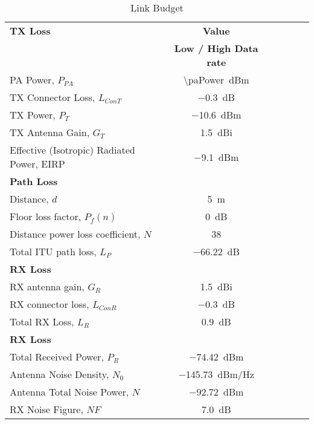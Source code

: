\begin{table}[htbp]
  \centering
  \caption{Link Budget}
    \begin{tabular}{lccccr}
    \rowcolor[rgb]{ 0,  0,  0} \textcolor[rgb]{ 1,  1,  1}{\textbf{TX Loss}}	& \textcolor[rgb]{ 1,  1,  1}{\textbf{Value}} 		\\
    \rowcolor[rgb]{ 0,  0,  0} \textcolor[rgb]{ 1,  1,  1}{} & \textcolor[rgb]{ 1,  1,  1}{\textbf{Low / High Data rate}} 		\\
    PA Power, $P_{PA}$ 						& \SI{\paPower}{dBm}										\\
    TX Connector Loss, $L_{ConT}$  				& \SI{-0.3}{dB} 											\\
    TX Power, $P_T$ 							& \SI{-10.6}{dBm}											\\
    TX Antenna Gain, $G_T$ 					& \SI{1.5}{dBi} 											\\
    Effective (Isotropic) Radiated Power, EIRP  		& \SI{-9.1}{dBm}										\\
    
    \rowcolor[rgb]{ 0,  0,  0} \textcolor[rgb]{ 1,  1,  1}{\textbf{Path Loss}}
    & \textcolor[rgb]{ 1,  1,  1}{\textbf{}} 															\\
    Distance, $d$  							& \SI{5}{m} 											\\
    Floor loss factor, $P_{f}(n)$ 					& \SI{0}{dB}											\\
    Distance power loss coefficient, $N$ 			& 38 												\\
    Total ITU path loss, $L_P$ 					& \SI{-66.22}{dB}										\\
    
    \rowcolor[rgb]{ 0,  0,  0} \textcolor[rgb]{ 1,  1,  1}{\textbf{RX Loss}}	& \textcolor[rgb]{ 1,  1,  1}{\textbf{}} 			\\
    RX antenna gain, $G_R$					& \SI{1.5}{dBi} 											\\
    RX connector loss, $L_{ConR}$ 				& \SI{-0.3}{dB}											\\
    Total RX Loss, $L_R$						& \SI{0.9}{dB}											\\
    
    \rowcolor[rgb]{ 0,  0,  0} \textcolor[rgb]{ 1,  1,  1}{\textbf{RX Loss}}	& \textcolor[rgb]{ 1,  1,  1}{\textbf{}} 			\\
    Total Received Power, $P_R$ 				& \SI{-74.42}{dBm}										\\
    Antenna Noise Density, $N_0$ 				& \SI{-145.73}{dBm/Hz}								\\
    Antenna Total Noise Power, $N$   				& \SI{-92.72}{dBm}										\\
    RX Noise Figure, $N\!F$ 					& \SI{7.0}{dB}									\\
        

\end{tabular}
\end{table}
